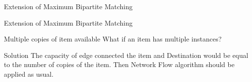 \documentclass{beamer}
\begin{document}
\begin{frame}{Extension of Maximum Bipartite Matching}
\begin{tikzpicture}
            
            

        \end{tikzpicture}
    
    
\end{frame}
\begin{frame}{Extension of Maximum Bipartite Matching}
    \begin{block}{Multiple copies of item available }
    What if an item has multiple instances?
\end{block}
\pause
    \begin{block}{Solution}
        The capacity of edge connected the item and Destination would be equal to the number of copies of the item. Then Network Flow algorithm should be applied as usual.
    \end{block}
\end{frame}
\end{document}
